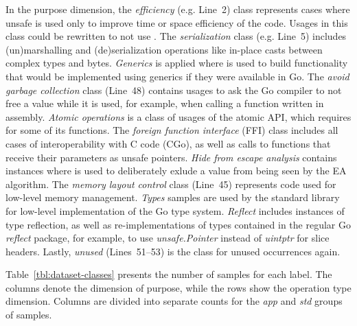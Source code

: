 In the purpose dimension, the \textit{efficiency} (e.g. Line~2) class represents cases where unsafe is used only to
improve time or space efficiency of the code.
Usages in this class could be rewritten to not use \unsafe{}.
The \textit{serialization} class (e.g. Line~5) includes (un)marshalling and (de)serialization operations like in-place
casts between complex types and bytes.
\textit{Generics} is applied where \unsafe{} is used to build functionality that would be implemented using generics if
they were available in Go.
The \textit{avoid garbage collection} class (Line~48) contains usages to ask the Go compiler to not free a value while
it is used, for example, when calling a function written in assembly.
\textit{Atomic operations} is a class of usages of the atomic \acrshort{API}, which requires \unsafe{} for some of its
functions.
The \textit{foreign function interface} (\acrshort{FFI}) class includes all cases of interoperability with C code (CGo),
as well as calls to functions that receive their parameters as unsafe pointers.
\textit{Hide from escape analysis} contains instances where \unsafe{} is used to deliberately exlude a value from being
seen by the \acrshort{EA} algorithm.
The \textit{memory layout control} class (Line~45) represents code used for low-level memory management.
\textit{Types} samples are used by the standard library for low-level implementation of the Go type system.
\textit{Reflect} includes instances of type reflection, as well as re-implementations of types contained in the regular
Go \textit{reflect} package, for example, to use \textit{unsafe.Pointer} instead of \textit{uintptr} for slice headers.
Lastly, \textit{unused} (Lines~51--53) is the class for unused occurrences again.

Table~\ref{tbl:dataset-classes} presents the number of samples for each label.
The columns denote the dimension of purpose, while the rows show the operation type dimension.
Columns are divided into separate counts for the \textit{app} and \textit{std} groups of samples.



